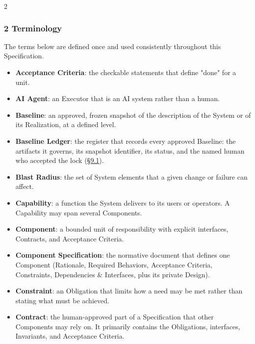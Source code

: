 \begin{multicols}{2}
\hypertarget{nss-2}{}

\subsubsection*{2 Terminology}

The terms below are defined once and used consistently throughout this Specification.

\begin{itemize}\setlength{\itemsep}{0pt}\setlength{\parskip}{0pt}

\item \textbf{Acceptance Criteria}: the checkable statements that define "done" for a unit.

\item \textbf{AI Agent}: an Executor that is an AI system rather than a human.

\item \textbf{Baseline}: an approved, frozen snapshot of the description of the System or of its Realization, at a defined level.

\item \textbf{Baseline Ledger}: the register that records every approved Baseline: the artifacts it governs, its snapshot identifier, its status, and the named human who accepted the lock (\hyperlink{nss-9.1}{\S9.1}).

\item \textbf{Blast Radius}: the set of System elements that a given change or failure can affect.

\item \textbf{Capability}: a function the System delivers to its users or operators. A Capability may span several Components.

\item \textbf{Component}: a bounded unit of responsibility with explicit interfaces, Contracts, and Acceptance Criteria.

\item \textbf{Component Specification}: the normative document that defines one Component (Rationale, Required Behaviors, Acceptance Criteria, Constraints, Dependencies \& Interfaces, plus its private Design).

\item \textbf{Constraint}: an Obligation that limits how a need may be met rather than stating what must be achieved.

\item \textbf{Contract}: the human-approved part of a Specification that other Components may rely on. It primarily contains the Obligations, interfaces, Invariants, and Acceptance Criteria.


\end{itemize}
\end{multicols}
